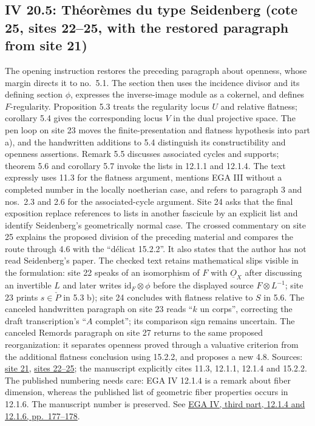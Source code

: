 \documentclass[10pt,a4paper]{article}
\begin{document}
\subsection*{IV 20.5: Théorèmes du type Seidenberg (cote 25, sites 22--25, with the restored paragraph from site 21)}
The opening instruction restores the preceding paragraph about openness, whose margin directs it to no.\ 5.1. The section then uses the incidence divisor and its defining section $\phi$, expresses the inverse-image module as a cokernel, and defines $F$-regularity. Proposition 5.3 treats the regularity locus $U$ and relative flatness; corollary 5.4 gives the corresponding locus $V$ in the dual projective space. The pen loop on site 23 moves the finite-presentation and flatness hypothesis into part a), and the handwritten additions to 5.4 distinguish its constructibility and openness assertions. Remark 5.5 discusses associated cycles and supports; theorem 5.6 and corollary 5.7 invoke the lists in 12.1.1 and 12.1.4. The text expressly uses 11.3 for the flatness argument, mentions EGA III without a completed number in the locally noetherian case, and refers to paragraph 3 and nos.\ 2.3 and 2.6 for the associated-cycle argument. Site 24 asks that the final exposition replace references to lists in another fascicule by an explicit list and identify Seidenberg's geometrically normal case. The crossed commentary on site 25 explains the proposed division of the preceding material and compares the route through 4.6 with the ``délicat 15.2.2''. It also states that the author has not read Seidenberg's paper. The checked text retains mathematical slips visible in the formulation: site 22 speaks of an isomorphism of $F$ with $\underline{O}_X$ after discussing an invertible $L$ and later writes $\mathrm{id}_F\otimes\phi$ before the displayed source $F\otimes L^{-1}$; site 23 prints $s\in\check P$ in 5.3 b); site 24 concludes with flatness relative to $S$ in 5.6. The canceled handwritten paragraph on site 23 reads ``$k$ un corps'', correcting the draft transcription's ``$A$ complet''; its comparison sign remains uncertain. The canceled Remords paragraph on site 27 returns to the same proposed reorganization: it separates openness proved through a valuative criterion from the additional flatness conclusion using 15.2.2, and proposes a new 4.8. Sources: \href{https://grothendieck.umontpellier.fr/web/viewer.html?file=../25.pdf\#page=22}{site 21}, \href{https://grothendieck.umontpellier.fr/web/viewer.html?file=../25.pdf\#page=23}{sites 22--25}; the manuscript explicitly cites 11.3, 12.1.1, 12.1.4 and 15.2.2. The published numbering needs care: EGA IV 12.1.4 is a remark about fiber dimension, whereas the published list of geometric fiber properties occurs in 12.1.6. The manuscript number is preserved. See \href{https://www.numdam.org/articles/10.1007/BF02684343/}{EGA IV, third part, 12.1.4 and 12.1.6, pp.\ 177--178}.
\par{}
\end{document}
